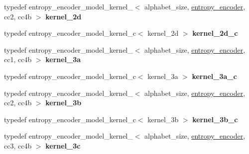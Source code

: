 \begin{DoxyCompactItemize}
\item 
\hypertarget{classdlib_1_1entropy__encoder__model_a5e03f6d4a8b52e3e2667134bb821d224}{
typedef entropy\_\-encoder\_\-model\_\-kernel\_$<$ alphabet\_\-size, \hyperlink{classdlib_1_1entropy__encoder}{entropy\_\-encoder}, cc2, cc4b $>$ {\bfseries kernel\_\-2d}}
\label{classdlib_1_1entropy__encoder__model_a5e03f6d4a8b52e3e2667134bb821d224}

\item 
\hypertarget{classdlib_1_1entropy__encoder__model_a065fb640734929aa764a22a2159d0053}{
typedef entropy\_\-encoder\_\-model\_\-kernel\_\-c$<$ kernel\_\-2d $>$ {\bfseries kernel\_\-2d\_\-c}}
\label{classdlib_1_1entropy__encoder__model_a065fb640734929aa764a22a2159d0053}

\item 
\hypertarget{classdlib_1_1entropy__encoder__model_afe9d7573593b4a4218ab7daeea1c9181}{
typedef entropy\_\-encoder\_\-model\_\-kernel\_$<$ alphabet\_\-size, \hyperlink{classdlib_1_1entropy__encoder}{entropy\_\-encoder}, cc1, cc4b $>$ {\bfseries kernel\_\-3a}}
\label{classdlib_1_1entropy__encoder__model_afe9d7573593b4a4218ab7daeea1c9181}

\item 
\hypertarget{classdlib_1_1entropy__encoder__model_aeaac6bdadbf9e6cf430b2a46ab72d26c}{
typedef entropy\_\-encoder\_\-model\_\-kernel\_\-c$<$ kernel\_\-3a $>$ {\bfseries kernel\_\-3a\_\-c}}
\label{classdlib_1_1entropy__encoder__model_aeaac6bdadbf9e6cf430b2a46ab72d26c}

\item 
\hypertarget{classdlib_1_1entropy__encoder__model_a40b97b86224a48ce04524dedcbe8afd9}{
typedef entropy\_\-encoder\_\-model\_\-kernel\_$<$ alphabet\_\-size, \hyperlink{classdlib_1_1entropy__encoder}{entropy\_\-encoder}, cc2, cc4b $>$ {\bfseries kernel\_\-3b}}
\label{classdlib_1_1entropy__encoder__model_a40b97b86224a48ce04524dedcbe8afd9}

\item 
\hypertarget{classdlib_1_1entropy__encoder__model_aa8bae2d5965ed9a80b39711e42ac5c07}{
typedef entropy\_\-encoder\_\-model\_\-kernel\_\-c$<$ kernel\_\-3b $>$ {\bfseries kernel\_\-3b\_\-c}}
\label{classdlib_1_1entropy__encoder__model_aa8bae2d5965ed9a80b39711e42ac5c07}

\item 
\hypertarget{classdlib_1_1entropy__encoder__model_ad97b6017ca7cca419f29216e8afb4cad}{
typedef entropy\_\-encoder\_\-model\_\-kernel\_$<$ alphabet\_\-size, \hyperlink{classdlib_1_1entropy__encoder}{entropy\_\-encoder}, cc3, cc4b $>$ {\bfseries kernel\_\-3c}}
\label{classdlib_1_1entropy__encoder__model_ad97b6017ca7cca419f29216e8afb4cad}


\end{DoxyCompactItemize}
